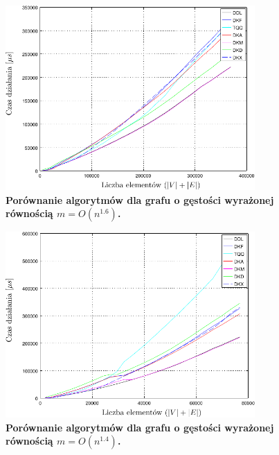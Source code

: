 \begin{figure}[!htbp]
	\null\hfill
	\includegraphics[width=0.85\textwidth]{Chapter_IV/graph160_psfrag.pdf}
	\hfill\null
	\caption{
		\textbf{Porównanie algorytmów dla grafu o gęstości wyrażonej równością $m = O \left( n^{1.6} \right)$.}
	}
	\label{fig:plotFullGraph_1.60}
\end{figure}

\begin{figure}[!htbp]
	\null\hfill
	\includegraphics[width=0.85\textwidth]{Chapter_IV/graph140_psfrag.pdf}
	\hfill\null
	\caption{
		\textbf{Porównanie algorytmów dla grafu o gęstości wyrażonej równością $m = O \left( n^{1.4} \right)$.}
	}
	\label{fig:plotFullGraph_1.40}
\end{figure}

